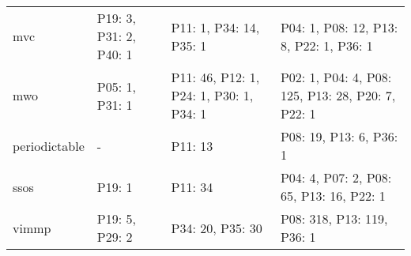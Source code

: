 \begin{table}
\begin{tabular}{m{3.5cm}m{2cm}m{2cm}m{2cm}}
                    mvc &  P19: 3, P31: 2, P40: 1 &                                  P11: 1, P34: 14, P35: 1 &                    P04: 1, P08: 12, P13: 8, P22: 1, P36: 1 \\
                    mwo &          P05: 1, P31: 1 &                  P11: 46, P12: 1, P24: 1, P30: 1, P34: 1 &          P02: 1, P04: 4, P08: 125, P13: 28, P20: 7, P22: 1 \\
          periodictable &                       - &                                                  P11: 13 &                                    P08: 19, P13: 6, P36: 1 \\
                   ssos &                  P19: 1 &                                                  P11: 34 &                   P04: 4, P07: 2, P08: 65, P13: 16, P22: 1 \\
                  vimmp &          P19: 5, P29: 2 &                                         P34: 20, P35: 30 &                                 P08: 318, P13: 119, P36: 1 \\
\bottomrule
\end{tabular}
\end{table}
                